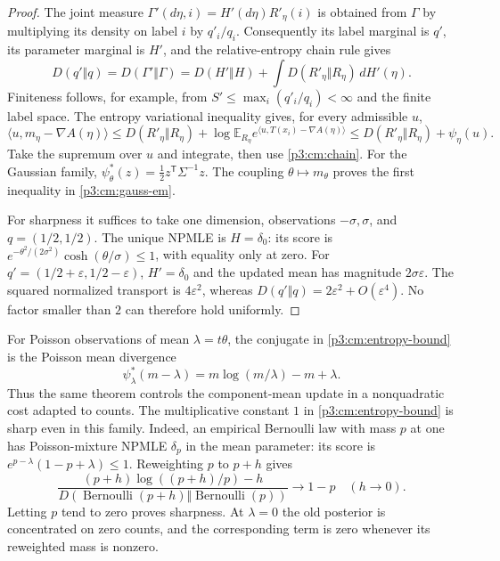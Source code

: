 \documentclass[11pt,a4paper]{article}
\theoremstyle{definition}
\theoremstyle{remark}
\numberwithin{equation}{section}
\begin{document}
\begin{proof}
The joint measure $\Gamma'(d\eta,i)=H'(d\eta)R'_\eta(i)$ is obtained
from $\Gamma$ by multiplying its density on label $i$ by $q'_i/q_i$.
Consequently its label marginal is $q'$, its parameter marginal is
$H'$, and the relative-entropy chain rule gives
\begin{equation}\label{p3:cm:chain}
 D(q'\Vert q)=D(\Gamma'\Vert\Gamma)
 =D(H'\Vert H)+\int D(R'_\eta\Vert R_\eta)\,dH'(\eta).
\end{equation}
Finiteness follows, for example, from
$S'\le\max_i(q'_i/q_i)<\infty$ and the finite label space.
The entropy variational inequality gives, for every admissible $u$,
\[
 \langle u,m_\eta-\nabla A(\eta)\rangle
 \le D(R'_\eta\Vert R_\eta)
 +\log\mathbb E_{R_\eta}
           e^{\langle u,T(x_i)-\nabla A(\eta)\rangle}
 \le D(R'_\eta\Vert R_\eta)+\psi_\eta(u).
\]
Take the supremum over $u$ and integrate, then use \eqref{p3:cm:chain}.
For the Gaussian family,
$\psi_\theta^*(z)=\frac12z^{\mathsf T}\Sigma^{-1}z$.
The coupling $\theta\mapsto m_\theta$ proves the first inequality in
\eqref{p3:cm:gauss-em}.

For sharpness it suffices to take one dimension, observations
$-\sigma,\sigma$, and $q=(1/2,1/2)$.  The unique NPMLE is
$H=\delta_0$: its score is
$e^{-\theta^2/(2\sigma^2)}\cosh(\theta/\sigma)\le1$, with equality
only at zero.  For $q'=(1/2+\varepsilon,1/2-\varepsilon)$,
$H'=\delta_0$ and the updated mean has magnitude $2\sigma\varepsilon$.
The squared normalized transport is $4\varepsilon^2$, whereas
$D(q'\Vert q)=2\varepsilon^2+O(\varepsilon^4)$.
No factor smaller than $2$ can therefore hold uniformly.
\end{proof}

For Poisson observations of mean $\lambda=t\theta$, the conjugate in
\eqref{p3:cm:entropy-bound} is the Poisson mean divergence
\begin{equation}\label{p3:cm:pois-em}
 \psi_\lambda^*(m-\lambda)
   =m\log(m/\lambda)-m+\lambda.
\end{equation}
Thus the same theorem controls the component-mean update in a
nonquadratic cost adapted to counts.  The multiplicative constant $1$
in \eqref{p3:cm:entropy-bound} is sharp even in this family.  Indeed,
an empirical Bernoulli law with mass $p$ at one has Poisson-mixture
NPMLE $\delta_p$ in the mean parameter: its score is
$e^{p-\lambda}(1-p+\lambda)\le1$.  Reweighting $p$ to $p+h$ gives
\[
 \frac{(p+h)\log((p+h)/p)-h}
 {D(\operatorname{Bernoulli}(p+h)\Vert
             \operatorname{Bernoulli}(p))}
 \longrightarrow1-p\quad(h\longrightarrow0).
\]
Letting $p$ tend to zero proves sharpness.  At $\lambda=0$ the old
posterior is concentrated on zero counts, and the corresponding term
is zero whenever its reweighted mass is nonzero.
\end{document}
